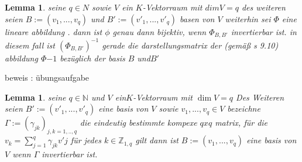 \documentclass[11pt]{article}
\newtheorem{lemma}[theorem]{Lemma}
\begin{document}
\begin{lemma}
 seine $q \in N$ sowie $V$ ein $K$-Vektorraum mit $dim V=q$ des weiteren seien $B:=(v_1,...,v_q) $ und $B':=(v'_1,...,v'_q)$ basen von $V$ 
 weiterhin sei $\Phi$  eine lineare abbildung . dann ist $\phi$ genau dann bijektiv, wenn $\mathbb{\Phi}_ {B,B'}$ invertierbar ist. in diesem fall ist 
 $(\mathbb{\Phi}_ {B,B'})^{-1}$ gerade die darstellungsmatrix der (gemäß s 9.10) abbildung $\Phi{-1}$ bezüglich der basis $B$ und$ B'$
\end{lemma}
beweis : übungsaufgabe
\begin{lemma}
seine $q \in \mathbb{N}$ und $V$ ein$K$-Vektorraum mit $\dim V=q$ Des Weiteren seien $B':=(v'_1,...,v'_q)$ eine basis von $V$ sowie $v_1,...,v_q \in V$
bezeichne $\Gamma:=(\gamma_{jk})_{j,k=1,..,q}$ die eindeutig bestimmte kompexe $qxq$ matrix, für die $v_k=\sum_{j=1}^q\gamma_{jk} v'j$ für jedes $k \in \mathbb{Z}_{1,q}$ gilt dann ist  $B:=(v_1,...,v_q)$ eine basis von $V$ wenn $\Gamma$ invertierbar ist.
\end{lemma}
\end{document}

